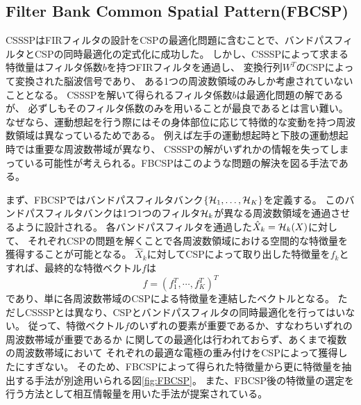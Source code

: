\subsection{Filter Bank Common Spatial Pattern(FBCSP)}
CSSSPはFIRフィルタの設計をCSPの最適化問題に含むことで、バンドパスフィルタとCSPの同時最適化の定式化に成功した。
しかし、CSSSPによって求まる特徴量はフィルタ係数\(b\)を持つFIRフィルタを通過し、
変換行列\(W^T\)のCSPによって変換された脳波信号であり、
ある1つの周波数領域のみしか考慮されていないこととなる。
CSSSPを解いて得られるフィルタ係数\(b\)は最適化問題の解であるが、
必ずしもそのフィルタ係数のみを用いることが最良であるとは言い難い。
なぜなら、運動想起を行う際にはその身体部位に応じて特徴的な変動を持つ周波数領域は異なっているためである。
例えば左手の運動想起時と下肢の運動想起時では重要な周波数帯域が異なり、
CSSSPの解がいずれかの情報を失ってしまっている可能性が考えられる。FBCSPはこのような問題の解決を図る手法である\cite{fbcsp}。

まず、FBCSPではバンドパスフィルタバンク\(\{ {\cal H}_1, \ldots, {\cal H}_K \}\)を定義する。
このバンドパスフィルタバンクは1つ1つのフィルタ\({\cal H}_k\)が異なる周波数領域を通過させるように設計される。
各バンドパスフィルタを通過した\(\hat X_k = {\cal H}_k(X)\)に対して、
それぞれCSPの問題を解くことで各周波数領域における空間的な特徴量を獲得することが可能となる。
\({\hat X}_k\)に対してCSPによって取り出した特徴量を\(f_k\)とすれば、最終的な特徴ベクトル\(f\)は
\begin{equation}
    f = (f_1^T,\cdots, f_K^T)^T
\end{equation}
であり、単に各周波数帯域のCSPによる特徴量を連結したベクトルとなる。
ただしCSSSPとは異なり、CSPとバンドパスフィルタの同時最適化を行ってはいない。
従って、特徴ベクトル\(f\)のいずれの要素が重要であるか、すなわちいずれの周波数帯域が重要であるか
に関しての最適化は行われておらず、あくまで複数の周波数帯域において
それぞれの最適な電極の重み付けをCSPによって獲得したにすぎない。
そのため、FBCSPによって得られた特徴量から更に特徴量を抽出する手法が別途用いられる図\ref{fig:FBCSP}。
また、FBCSP後の特徴量の選定を行う方法として相互情報量を用いた手法が提案されている\cite{fbcspBCICOMPE}。

